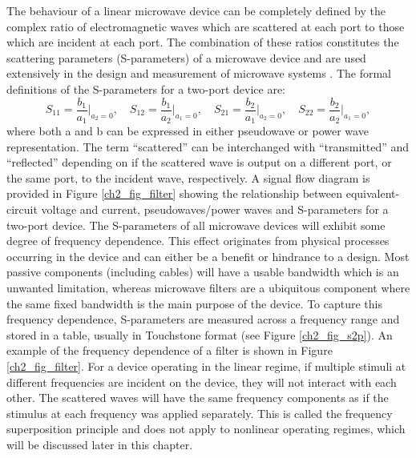 \documentclass[../thesis/thesis.tex]{subfiles}
\begin{document}
\begin{refsection}
The behaviour of a linear microwave device can be completely defined by the complex ratio of electromagnetic waves which are scattered at each port to those which are incident at each port. The combination of these ratios constitutes the scattering parameters (S-parameters) of a microwave device and are used extensively in the design and measurement of microwave systems \cite{Pozar_2004}. The formal definitions of the S-parameters for a two-port device are:
\begin{equation}
S_{11}=\dfrac{b_1}{a_1}\bigg\rvert_{a_2=0},\quad
S_{12}=\dfrac{b_1}{a_2}\bigg\rvert_{a_1=0},\quad
S_{21}=\dfrac{b_2}{a_1}\bigg\rvert_{a_2=0},\quad
S_{22}=\dfrac{b_2}{a_2}\bigg\rvert_{a_1=0},
\label{ch2_eqn_sp}
\end{equation}
where both a and b can be expressed in either pseudowave or power wave representation. The term “scattered” can be interchanged with “transmitted” and “reflected” depending on if the scattered wave is output on a different port, or the same port, to the incident wave, respectively. A signal flow diagram is provided in Figure \ref{ch2_fig_filter} showing the relationship between equivalent-circuit voltage and current, pseudowaves/power waves and S-parameters for a two-port device.
The S-parameters of all microwave devices will exhibit some degree of frequency dependence. This effect originates from physical processes occurring in the device and can either be a benefit or hindrance to a design. Most passive components (including cables) will have a usable bandwidth which is an unwanted limitation, whereas microwave filters are a ubiquitous component where the same fixed bandwidth is the main purpose of the device. To capture this frequency dependence, S-parameters are measured across a frequency range and stored in a table, usually in Touchstone format (see Figure \ref{ch2_fig_s2p}). An example of the frequency dependence of a filter is shown in Figure \ref{ch2_fig_filter}. For a device operating in the linear regime, if multiple stimuli at different frequencies are incident on the device, they will not interact with each other. The scattered waves will have the same frequency components as if the stimulus at each frequency was applied separately. This is called the frequency superposition principle and does not apply to nonlinear operating regimes, which will be discussed later in this chapter.


\end{refsection}
\end{document}
